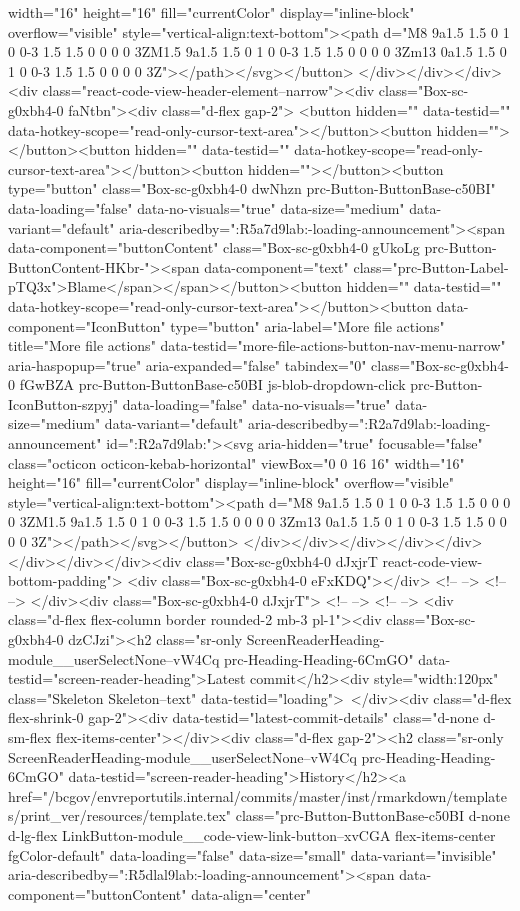 {{{{{{{{{{{{{{{{{{{{{{{{{{{{{{{width="16" height="16" fill="currentColor" display="inline-block" overflow="visible" style="vertical-align:text-bottom"><path d="M8 9a1.5 1.5 0 1 0 0-3 1.5 1.5 0 0 0 0 3ZM1.5 9a1.5 1.5 0 1 0 0-3 1.5 1.5 0 0 0 0 3Zm13 0a1.5 1.5 0 1 0 0-3 1.5 1.5 0 0 0 0 3Z"></path></svg></button> </div></div></div><div class="react-code-view-header-element--narrow"><div class="Box-sc-g0xbh4-0 faNtbn"><div class="d-flex gap-2"> <button hidden="" data-testid="" data-hotkey-scope="read-only-cursor-text-area"></button><button hidden=""></button><button hidden="" data-testid="" data-hotkey-scope="read-only-cursor-text-area"></button><button hidden=""></button><button type="button" class="Box-sc-g0xbh4-0 dwNhzn prc-Button-ButtonBase-c50BI" data-loading="false" data-no-visuals="true" data-size="medium" data-variant="default" aria-describedby=":R5a7d9lab:-loading-announcement"><span data-component="buttonContent" class="Box-sc-g0xbh4-0 gUkoLg prc-Button-ButtonContent-HKbr-"><span data-component="text" class="prc-Button-Label-pTQ3x">Blame</span></span></button><button hidden="" data-testid="" data-hotkey-scope="read-only-cursor-text-area"></button><button data-component="IconButton" type="button" aria-label="More file actions" title="More file actions" data-testid="more-file-actions-button-nav-menu-narrow" aria-haspopup="true" aria-expanded="false" tabindex="0" class="Box-sc-g0xbh4-0 fGwBZA prc-Button-ButtonBase-c50BI js-blob-dropdown-click prc-Button-IconButton-szpyj" data-loading="false" data-no-visuals="true" data-size="medium" data-variant="default" aria-describedby=":R2a7d9lab:-loading-announcement" id=":R2a7d9lab:"><svg aria-hidden="true" focusable="false" class="octicon octicon-kebab-horizontal" viewBox="0 0 16 16" width="16" height="16" fill="currentColor" display="inline-block" overflow="visible" style="vertical-align:text-bottom"><path d="M8 9a1.5 1.5 0 1 0 0-3 1.5 1.5 0 0 0 0 3ZM1.5 9a1.5 1.5 0 1 0 0-3 1.5 1.5 0 0 0 0 3Zm13 0a1.5 1.5 0 1 0 0-3 1.5 1.5 0 0 0 0 3Z"></path></svg></button> </div></div></div></div></div></div></div></div><div class="Box-sc-g0xbh4-0 dJxjrT react-code-view-bottom-padding"> <div class="Box-sc-g0xbh4-0 eFxKDQ"></div> <!-- --> <!-- --> </div><div class="Box-sc-g0xbh4-0 dJxjrT"> <!-- --> <!-- --> <div class="d-flex flex-column border rounded-2 mb-3 pl-1"><div class="Box-sc-g0xbh4-0 dzCJzi"><h2 class="sr-only ScreenReaderHeading-module__userSelectNone--vW4Cq prc-Heading-Heading-6CmGO" data-testid="screen-reader-heading">Latest commit</h2><div style="width:120px" class="Skeleton Skeleton--text" data-testid="loading"> </div><div class="d-flex flex-shrink-0 gap-2"><div data-testid="latest-commit-details" class="d-none d-sm-flex flex-items-center"></div><div class="d-flex gap-2"><h2 class="sr-only ScreenReaderHeading-module__userSelectNone--vW4Cq prc-Heading-Heading-6CmGO" data-testid="screen-reader-heading">History</h2><a href="/bcgov/envreportutils.internal/commits/master/inst/rmarkdown/templates/print_ver/resources/template.tex" class="prc-Button-ButtonBase-c50BI d-none d-lg-flex LinkButton-module__code-view-link-button--xvCGA flex-items-center fgColor-default" data-loading="false" data-size="small" data-variant="invisible" aria-describedby=":R5dlal9lab:-loading-announcement"><span data-component="buttonContent" data-align="center" }}}}}}}}}}}}}}}}}}}}}}}}}}}}}}}
